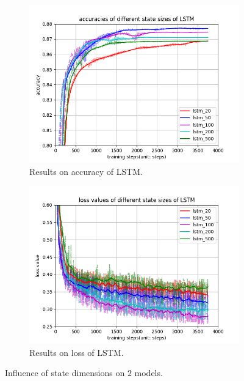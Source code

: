 \documentclass[12pt,letterpaper]{article}
\begin{document}
\begin{figure}[h]
    \medskip
    \begin{subfigure}{0.49\textwidth}
    \includegraphics[width=\linewidth]{lstm_acc.png}
    \caption{\small Results on accuracy of LSTM.} \label{fig:c}
    \end{subfigure}\hspace*{\fill}
    \begin{subfigure}{0.49\textwidth}
    \includegraphics[width=\linewidth]{lstm_loss.png}
    \caption{\small Results on loss of LSTM.} \label{fig:d}
    \end{subfigure}
    \caption{Influence of state dimensions on $2$ models.} \label{fig:state_dim}
\end{figure}
\end{document}
